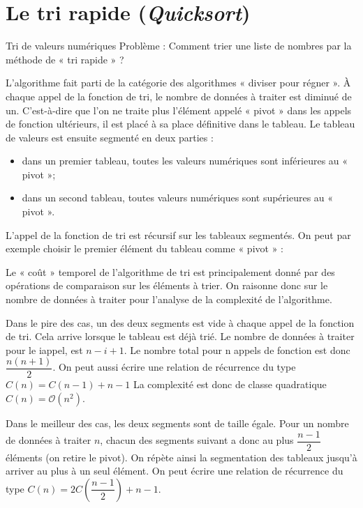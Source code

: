 \documentclass[10pt,fleqn]{article} %
\begin{document}

\section{Le tri rapide (\textit{Quicksort})}


\begin{exemple}
Tri de valeurs numériques
Problème : Comment trier une liste de nombres par la méthode de « tri rapide » ?
\end{exemple}
L'algorithme fait parti de la catégorie des algorithmes « diviser pour régner ».
À chaque appel de la fonction de tri, le nombre de données à traiter est diminué de un. C'est-à-dire que l'on ne traite plus l'élément appelé « pivot » dans les appels de fonction ultérieurs, il est placé à sa place définitive dans le tableau.
Le tableau de valeurs est ensuite segmenté en deux parties :
\begin{itemize}
\item dans un premier tableau, toutes les valeurs numériques sont inférieures au « pivot »;
\item dans un second tableau, toutes valeurs numériques sont supérieures au « pivot ».
\end{itemize}

L'appel de la fonction de tri est récursif sur les tableaux segmentés.
On peut par exemple choisir le premier élément du tableau comme « pivot » :




Le « coût » temporel de l'algorithme de tri est principalement donné par des opérations de comparaison sur les éléments à trier. On raisonne donc sur le nombre de données à traiter pour l'analyse de la complexité de l'algorithme.

Dans le pire des cas, un des deux segments est vide à chaque appel de la fonction de tri. Cela arrive lorsque le tableau est déjà trié. Le nombre de données à traiter  pour le i\ieme appel, est $n - i + 1$.
Le nombre total pour n appels de fonction est donc $\dfrac{n(n+1)}{2}$. On peut aussi écrire une relation de récurrence du type $C(n) = C(n-1) + n - 1$
La complexité est donc de classe quadratique $C(n) = \mathcal{O}\left(n^2\right)$.

Dans le meilleur des cas, les deux segments sont de taille égale. Pour un nombre de données à traiter $n$, chacun des segments suivant a donc au plus $\dfrac{n-1}{2}$ éléments (on retire le pivot). On répète ainsi la segmentation des tableaux jusqu'à arriver au plus à un seul élément. 
On peut écrire une relation de récurrence du type $C(n) = 2 C\left(\dfrac{n - 1}{ 2} \right)  +  n - 1$.
 
\end{document}
